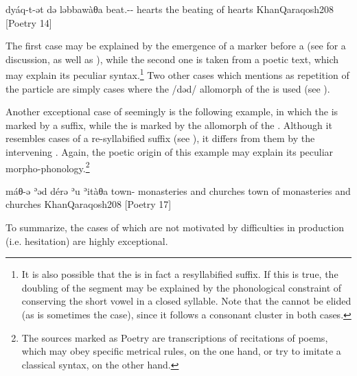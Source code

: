 {dyáq-t-ət də\cb{} ləbbawàθa}
{beat.\inf-\fem-\cst{} \lnk\cb{} hearts}
{the beating of hearts}
{KhanQaraqosh}{208 {[Poetry 14]}}

The first case may be  explained by the emergence of a  marker before a  (see  for a discussion, as well as ), while the second one is taken from a poetic text, which may explain its peculiar syntax.\footnote{It is also possible that the \lnk* is in fact a resyllabified \cst* suffix. If this is true, the doubling of the  segment may be explained by the phonological constraint of conserving the short \phonetic[ə] vowel in a closed syllable. Note that the  cannot be elided (as is sometimes the case), since it follows a consonant cluster in both cases.}  Two other cases which \citet[209]{KhanQaraqosh} mentions as repetition of the  particle are simply cases where the \ph/dəd/ allomorph of the \lnk* is used (see ).

Another exceptional case of seemingly  is the following example, in which the \prim is marked by a  suffix, while the \secn is marked by the  allomorph of the \lnk*. Although it resembles cases of a re-syllabified \cst* suffix (see ), it differs from them by the intervening . Again, the poetic origin of this example may explain its peculiar morpho-phonology.\footnote{The sources marked as Poetry are transcriptions of recitations of poems, which may obey specific metrical rules, on the one hand, or try to imitate a classical syntax, on the other hand.} 

{máθ-ə ʾəd\cb{} dérə ʾu\cb{} ʾitàθa}
{town-\cst{} \lnk\cb{} monasteries and\cb{} churches}
{town of monasteries and churches}
{KhanQaraqosh}{208 {[Poetry 17]}}

To summarize, the cases of  which are not motivated by difficulties in production (i.e. hesitation) are highly exceptional.























